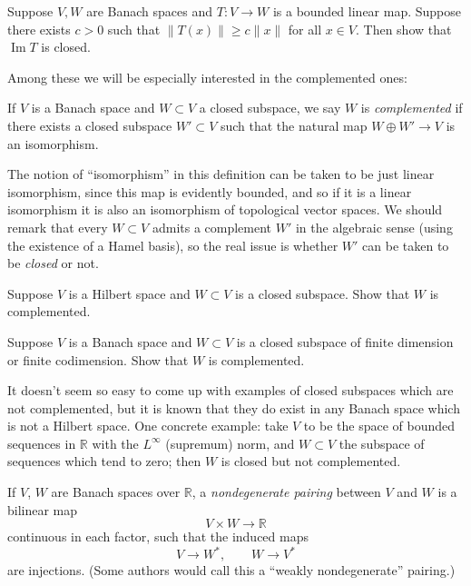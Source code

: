 \documentclass[12pt,letterpaper,reqno]{article}
\numberwithin{equation}{section}
\newcommand{\R}{\ensuremath{\mathbb R}}
\newcommand{\norm}[1]{\lVert#1\rVert}
\newcommand{\ti}[1]{\textit{#1}}
\DeclareMathOperator{\im}{Im}
\begin{document}
\begin{exercise} Suppose $V,W$ are Banach spaces and $T: V \to W$ is a
bounded linear map. Suppose there exists $c > 0$ such that
$\norm{T(x)} \ge c \norm{x}$ for all $x \in V$. 
Then show that $\im T$ is closed.
\end{exercise}


Among these we will be especially interested in the 
complemented ones:

\begin{defn} If $V$ is a Banach space
and $W \subset V$ a closed subspace, we say $W$ is
\ti{complemented} if there exists a closed subspace $W' \subset V$
such that the natural map $W \oplus W' \to V$
is an isomorphism.
\end{defn}

The notion of ``isomorphism'' in this definition can be taken to be
just linear isomorphism, since this map is evidently bounded, and so
if it is a linear isomorphism it is also an isomorphism of topological
vector spaces.
We should remark that every $W \subset V$ admits a complement $W'$ 
in the algebraic sense
(using the existence of a Hamel basis), so the real issue is whether
$W'$ can be taken to be \ti{closed} or not.

\begin{exercise} Suppose $V$ is a Hilbert space and $W \subset V$
is a closed subspace. Show that $W$ is complemented.
\end{exercise}

\begin{exercise} Suppose $V$ is a Banach space and
 $W \subset V$ is a closed subspace of finite dimension
 or finite codimension.
 Show that $W$ is complemented.
\end{exercise}

It doesn't seem so easy to come up with examples of closed subspaces
which are not complemented, but it is known that they do exist in
any Banach space which is not a Hilbert space. One concrete example:
take $V$ to be the space of bounded sequences in $\R$ 
with the $L^\infty$ (supremum) norm, and $W \subset V$
the subspace of sequences which tend to zero; then $W$ is closed but
not complemented.


\begin{defn} If $V$, $W$
are Banach spaces over $\R$, a \ti{nondegenerate pairing}
between $V$ and $W$ is a bilinear map
\begin{equation}
  V \times W \to \R
\end{equation}
continuous in each factor,
such that the induced maps
\begin{equation}
  V \to W^*, \qquad W \to V^*
\end{equation}
are injections.
(Some authors would call this a ``weakly nondegenerate'' pairing.)
\end{defn}
\end{document}
